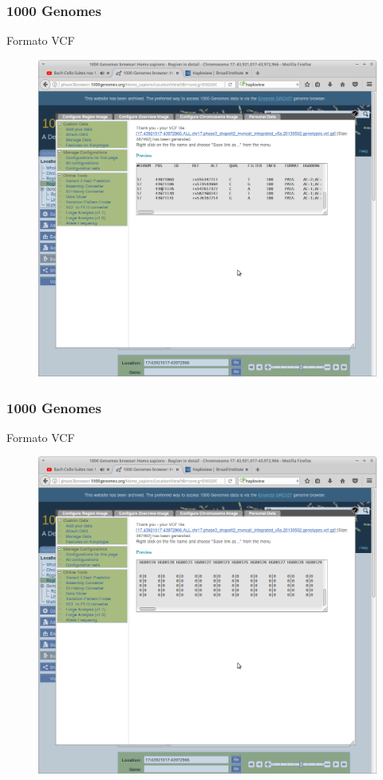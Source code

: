 \documentclass{beamer}\usepackage[]{graphicx}\usepackage[]{color}
\begin{document}
\begin{frame}[fragile]
\frametitle{1000 Genomes}
Formato VCF
\begin{figure}[htbp]
\begin{center}
\includegraphics[width=.7\linewidth]{vcf1.png}
\end{center}
\end{figure}

\end{frame}



\begin{frame}[fragile]
\frametitle{1000 Genomes}
Formato VCF
\begin{figure}[htbp]
\begin{center}
\includegraphics[width=.7\linewidth]{vcf2.png}
\end{center}
\end{figure}
\end{frame}
\end{document}

